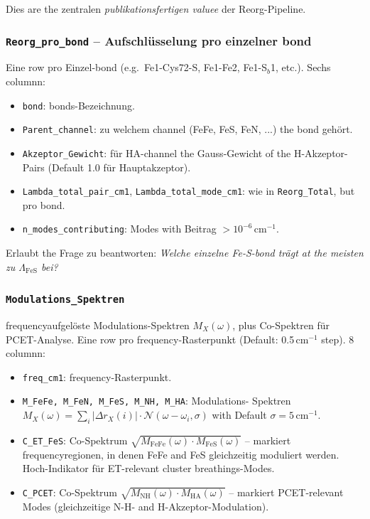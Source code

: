 \documentclass[11pt,a4paper,twoside]{article}
\theoremstyle{remark}
\begin{document}
Dies are the zentralen \emph{publikationsfertigen valuee} der
Reorg-Pipeline.

\subsubsection*{\texttt{Reorg\_pro\_bond} -- Aufschl\"usselung
                  pro einzelner bond}

Eine row pro Einzel-bond (e.g.\ Fe1-Cys72-S, Fe1-Fe2,
Fe1-S$_b$1, etc.). Sechs columnn:

\begin{itemize}\setlength{\itemsep}{0pt}
  \item \texttt{bond}: bonds-Bezeichnung.
  \item \texttt{Parent\_channel}: zu welchem channel (FeFe, FeS, FeN, ...)
        the bond geh\"ort.
  \item \texttt{Akzeptor\_Gewicht}: f\"ur HA-channel the Gauss-Gewicht
        of the H-Akzeptor-Pairs (Default 1.0 f\"ur Hauptakzeptor).
  \item \texttt{Lambda\_total\_pair\_cm1}, \texttt{Lambda\_total\_mode\_cm1}:
        wie in \texttt{Reorg\_Total}, but pro bond.
  \item \texttt{n\_modes\_contributing}: Modes with Beitrag $> 10^{-6}$\,cm$^{-1}$.
\end{itemize}

Erlaubt the Frage zu beantworten: \emph{Welche einzelne Fe-S-bond
tr\"agt at the meisten zu $\Lambda_\text{FeS}$ bei?}

\subsubsection*{\texttt{Modulations\_Spektren}}

frequencyaufgel\"oste Modulations-Spektren $M_X(\omega)$, plus
Co-Spektren f\"ur PCET-Analyse. Eine row pro frequency-Rasterpunkt
(Default: 0.5\,cm$^{-1}$ step). 8 columnn:

\begin{itemize}\setlength{\itemsep}{0pt}
  \item \texttt{freq\_cm1}: frequency-Rasterpunkt.
  \item \texttt{M\_FeFe, M\_FeN, M\_FeS, M\_NH, M\_HA}: Modulations-
        Spektren $M_X(\omega) = \sum_i |\Delta r_X(i)| \cdot
        \mathcal{N}(\omega - \omega_i, \sigma)$ with Default
        $\sigma=5$\,cm$^{-1}$.
  \item \texttt{C\_ET\_FeS}: Co-Spektrum
        $\sqrt{M_\text{FeFe}(\omega) \cdot M_\text{FeS}(\omega)}$
        -- markiert frequencyregionen, in denen FeFe and FeS
        gleichzeitig moduliert werden. Hoch-Indikator f\"ur
        ET-relevant cluster breathings-Modes.
  \item \texttt{C\_PCET}: Co-Spektrum
        $\sqrt{M_\text{NH}(\omega) \cdot M_\text{HA}(\omega)}$
        -- markiert PCET-relevant Modes (gleichzeitige
        N-H- and H-Akzeptor-Modulation).
\end{itemize}
\end{document}
